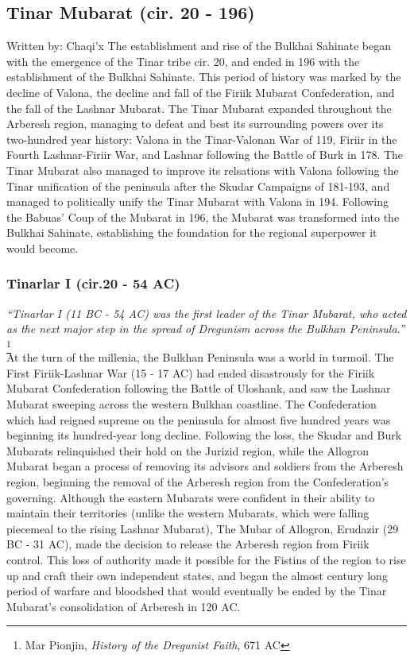 	\subsection{Tinar Mubarat (cir. 20 - 196)}	
		Written by: Chaqi'x			
		The establishment and rise of the Bulkhai Sahinate began with the emergence of the Tinar tribe cir. 20, and ended in 196 with the establishment of the Bulkhai Sahinate. This period of history was marked by the decline of Valona, the decline and fall of the Firiik Mubarat Confederation, and the fall of the Lashnar Mubarat. The Tinar Mubarat expanded throughout the Arberesh region, managing to defeat and best its surrounding powers over its two-hundred year history: Valona in the Tinar-Valonan War of 119, Firiir in the Fourth Lashnar-Firiir War, and Lashnar following the Battle of Burk in 178. The Tinar Mubarat also managed to improve its relsations with Valona following the Tinar unification of the peninsula after the Skudar Campaigns of 181-193, and managed to politically unify the Tinar Mubarat with Valona in 194. Following the Babuas' Coup of the Mubarat in 196, the Mubarat was transformed into the Bulkhai Sahinate, establishing the foundation for the regional superpower it would become.
		\subsubsection{Tinarlar I (cir.20 - 54 AC)}
			\textit{``Tinarlar I (11 BC - 54 AC) was the first leader of the Tinar Mubarat, who acted as the next major step in the spread of Dregunism across the Bulkhan Peninsula.''} \footnote{Mar Pionjin, \textit{History of the Dregunist Faith}, 671 AC}\\

			At the turn of the millenia, the Bulkhan Peninsula was a world in turmoil. The First Firiik-Lashnar War (15 - 17 AC) had ended disastrously for the Firiik Mubarat Confederation following the Battle of Uloshank, and saw the Lashnar Mubarat sweeping across the western Bulkhan coastline. The Confederation which had reigned supreme on the peninsula for almost five hundred years was beginning its hundred-year long decline. Following the loss, the Skudar and Burk Mubarats relinquished their hold on the Jurizid region, while the Allogron Mubarat began a process of removing its advisors and soldiers from the Arberesh region, beginning the removal of the Arberesh region from the Confederation's governing. Although the eastern Mubarats were confident in their ability to maintain their territories (unlike the western Mubarats, which were falling piecemeal to the rising Lashnar Mubarat), The Mubar of Allogron, Erudazir (29 BC - 31 AC), made the decision to release the Arberesh region from Firiik control. This loss of authority made it possible for the Fistins of the region to rise up and craft their own independent states, and began the almost century long period of warfare and bloodshed that would eventually be ended by the Tinar Mubarat's consolidation of Arberesh in 120 AC. 
			
